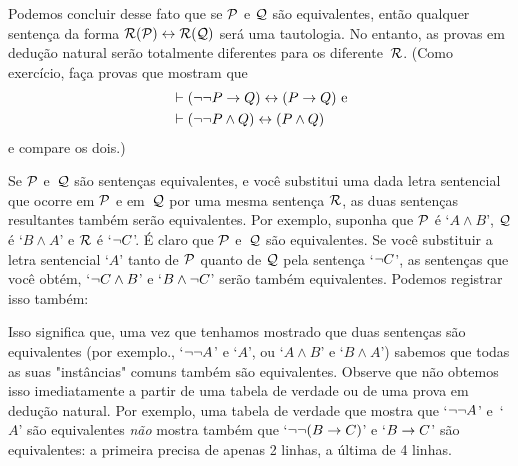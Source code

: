 
Podemos concluir desse fato que se $\mathcal{P}$ e $\mathcal{Q}$ são equivalentes, então qualquer sentença da forma $\mathcal{R}(\mathcal{P}) \leftrightarrow \mathcal{R}(\mathcal{Q})$  será uma tautologia. No entanto, as provas em dedução natural serão totalmente diferentes para os diferente~$\mathcal{R}$. (Como exercício, faça  provas que mostram que 
\begin{align*}
	& \vdash (\neg\neg P \rightarrow Q) \leftrightarrow (P \rightarrow Q)  \text{ e}\\
	& \vdash (\neg\neg P \wedge Q) \leftrightarrow (P \wedge Q)
\end{align*}
e compare os dois.)

Se $\mathcal{P}$ e~$\mathcal{Q}$ são sentenças equivalentes, e você substitui uma dada letra sentencial que ocorre em $\mathcal{P}$ e em~$\mathcal{Q}$ por uma mesma sentença $\mathcal{R}$, as duas sentenças resultantes também serão equivalentes. Por exemplo, suponha que $\mathcal{P}$ é  `$A \land B$', $\mathcal{Q}$ é `$B \land A$’ e   $\mathcal{R}$ é `$\neg C$’. É claro que $\mathcal{P}$ e~$\mathcal{Q}$ são equivalentes. Se você substituir a letra sentencial `$A$' tanto de $\mathcal{P}$ quanto de $\mathcal{Q}$ pela sentença `$\neg C$’, as sentenças que você obtém, `$\neg C \land B$' e `$B \land \neg C$’  serão também equivalentes. 
Podemos registrar isso também:


Isso significa que, uma vez que tenhamos mostrado que duas sentenças são equivalentes (por exemplo., `$\neg\neg A$' e `$A$', ou `$A \land B$' e `$B \land A$') sabemos que todas as suas "instâncias" comuns também são equivalentes. Observe que não obtemos isso imediatamente a partir de uma tabela de verdade ou de uma prova em dedução natural. Por exemplo, uma tabela de verdade que mostra que `$\neg\neg A$' e~`$A$' são equivalentes \emph{não} mostra também que `$\neg\neg(B \rightarrow C)$' e `$B \rightarrow C$' são equivalentes: a primeira precisa de apenas 2 linhas, a última de 4 linhas.


